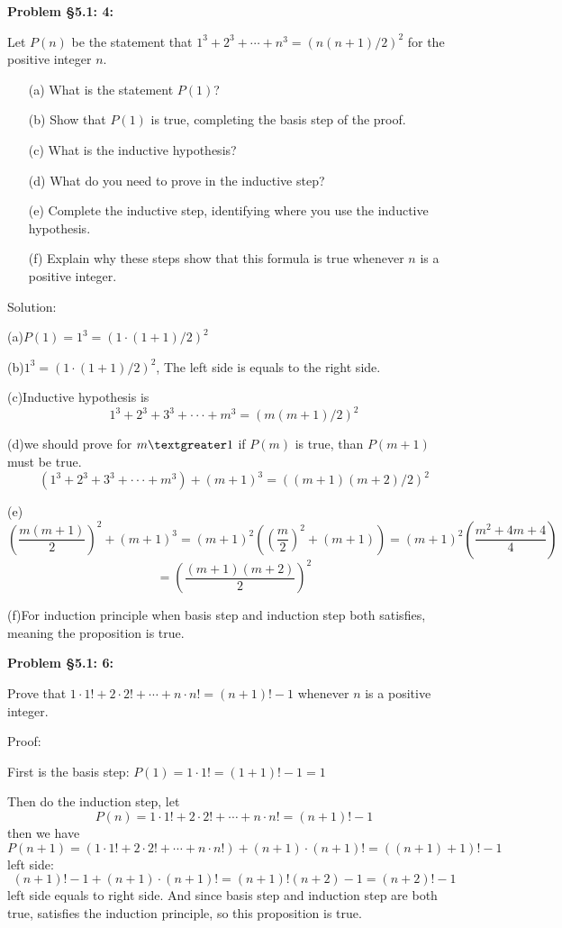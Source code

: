 \documentclass{article}
\newenvironment{problem}[1]
{\begin{mdframed}[default]
\textbf{Problem #1:}
}
{\end{mdframed}
}
\begin{document}
\begin{problem}{\S 5.1: 4}
Let $P(n)$ be the statement that $1^3 + 2^3 + \cdots + n^3 = (n(n+1)/2)^2$ for the
positive integer $n$.
\begin{enumerate}
\item[(a)] What is the statement $P(1)$?
\item[(b)] Show that $P(1)$ is true, completing the basis step of the proof.
\item[(c)] What is the inductive hypothesis?
\item[(d)] What do you need to prove in the inductive step?
\item[(e)] Complete the inductive step, identifying where you use the inductive
hypothesis.
\item[(f)] Explain why these steps show that this formula is true whenever $n$
is a positive integer.
\end{enumerate}

Solution:

(a)$P(1)=1^3=(1\cdot (1+1)/2)^2$

(b)$1^3=(1\cdot (1+1)/2)^2$, The left side is equals to the right side.

(c)Inductive hypothesis is 
\[1^3+2^3+3^3+\cdot \cdot \cdot +m^3=(m(m+1)/2)^2\]

(d)we should prove for $m\textgreater1$ if $P(m)$ is true, than $P(m+1)$ must be true.
\[(1^3+2^3+3^3+\cdot \cdot \cdot +m^3)+(m+1)^3=((m+1)(m+2)/2)^2\]

(e)\[\left( \frac{m(m+1)}{2}\right)^2+(m+1)^3=(m+1)^2\left(\left(\frac{m}{2}\right)^2+(m+1)\right)=(m+1)^2\left(\frac{m^2+4m+4}{4}\right)\]
\[=\left(\frac{(m+1)(m+2)}{2}\right)^2\]

(f)For induction principle when basis step and induction step both satisfies, meaning the proposition is true.
\end{problem}
\begin{problem}{\S 5.1: 6}
Prove that $1 \cdot 1! + 2 \cdot 2! + \cdots + n \cdot n! = (n+1)!-1$ whenever $n$
is a positive integer.

Proof:

First is the basis step: $P(1)=1\cdot1!=(1+1)!-1=1$

Then do the induction step, let 
\[P(n)=1 \cdot 1! + 2 \cdot 2! + \cdots + n \cdot n! = (n+1)!-1\]
then we have
\[P(n+1)=(1 \cdot 1! + 2 \cdot 2! + \cdots + n \cdot n!) + (n+1)\cdot (n+1)! = ((n+1)+1)!-1\]
left side:
\[(n+1)!-1+(n+1)\cdot(n+1)!=(n+1)!(n+2)-1=(n+2)!-1\]
left side equals to right side.
And since basis step and induction step are both true, satisfies the induction principle, so this proposition is true.

\end{problem}
\end{document}
